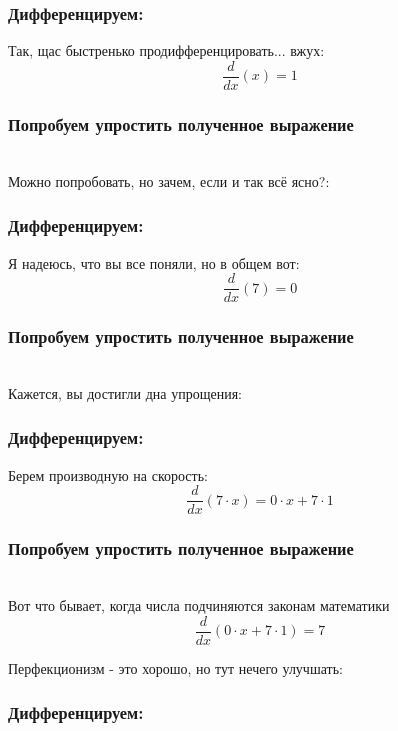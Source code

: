 \documentclass[a4paper,12pt]{article}
\begin{document}
\subsubsection*{Дифференцируем:}

Так, щас быстренько продифференцировать... вжух:
\begin{dmath}\frac{d}{dx}\left(x\right)=1\end{dmath}
\subsubsection*{Попробуем упростить полученное выражение}
\\Можно попробовать, но зачем, если и так всё ясно?:

\subsubsection*{Дифференцируем:}

Я надеюсь, что вы все поняли, но в общем вот:
\begin{dmath}\frac{d}{dx}\left(7\right)=0\end{dmath}
\subsubsection*{Попробуем упростить полученное выражение}
\\Кажется, вы достигли дна упрощения:

\subsubsection*{Дифференцируем:}

Берем производную на скорость:
\begin{dmath}\frac{d}{dx}\left(7\cdot x\right)=0\cdot x+ 7\cdot 1\end{dmath}
\subsubsection*{Попробуем упростить полученное выражение}
\\Вот что бывает, когда числа подчиняются законам математики\\
\begin{dmath}
	\frac{d}{dx}\left(0\cdot x+ 7\cdot 1\right) = 7\end{dmath}

Перфекционизм - это хорошо, но тут нечего улучшать:

\subsubsection*{Дифференцируем:}
\end{document}
